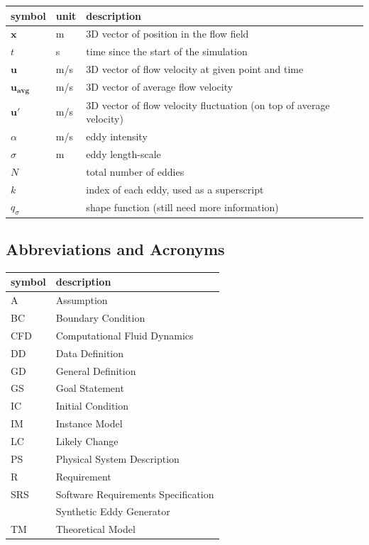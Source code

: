 \documentclass[12pt]{article}
\begin{document}
\renewcommand{\arraystretch}{1.2}
\noindent \begin{longtable*}{l l p{12cm}} \toprule
\textbf{symbol} & \textbf{unit} & \textbf{description}\\
\midrule 
$\mathbf{x}$ & \si{\metre} & 3D vector of position in the flow field
\\
$t$ & \si{\second} & time since the start of the simulation
\\
$\mathbf{u}$ & \si[per-mode=symbol] {\metre\per\second} & 3D vector of flow velocity at given point and time
\\
$\mathbf{u_{\text{avg}}}$ & \si[per-mode=symbol] {\metre\per\second} & 3D vector of average flow velocity
\\
$\mathbf{u'}$ & \si[per-mode=symbol] {\metre\per\second} & 3D vector of flow velocity fluctuation (on top of average velocity)
\\
$\alpha$ & \si[per-mode=symbol] {\metre\per\second} & eddy intensity
\\
$\sigma$ & \si{\metre} & eddy length-scale
\\ 
$N$ &  & total number of eddies
\\ 
$k$ &  & index of each eddy, used as a superscript
\\
$q_\sigma$ &  & shape function (still need more information)
\\
\bottomrule
\end{longtable*}

\subsection{Abbreviations and Acronyms}

\renewcommand{\arraystretch}{1.2}
\begin{tabular}{l l} 
  \toprule		
  \textbf{symbol} & \textbf{description}\\
  \midrule 
  A & Assumption\\
  BC & Boundary Condition\\
  CFD & Computational Fluid Dynamics\\
  DD & Data Definition\\
  GD & General Definition\\
  GS & Goal Statement\\
  IC & Initial Condition\\
  IM & Instance Model\\
  LC & Likely Change\\
  PS & Physical System Description\\
  R & Requirement\\
  SRS & Software Requirements Specification\\
  \progname{} & Synthetic Eddy Generator\\
  TM & Theoretical Model\\
  \bottomrule
\end{tabular}\\
\end{document}
